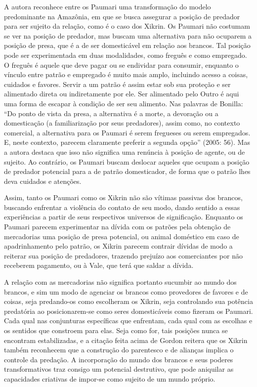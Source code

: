 \documentclass{article}
\begin{document}
A autora reconhece entre os Paumari uma transforma\c{c}\~ao do modelo
predominante na Amaz\^onia, em que se busca assegurar a posi\c{c}\~ao
de predador para ser sujeito da rela\c{c}\~ao, como \'e o caso dos
Xikrin. Os Paumari n\~ao costumam se ver na posi\c{c}\~ao de predador,
mas buscam uma alternativa para n\~ao ocuparem a posi\c{c}\~ao de
presa, que \'e a de ser domestic\'avel em rela\c{c}\~ao aos brancos.
Tal posi\c{c}\~ao pode ser experimentada em duas modalidades, como
fregu\^es e como empregado. O fregu\^es \'e aquele que deve pagar ou se
endividar para consumir, enquanto o v\'inculo entre patr\~ao e
empregado \'e muito mais amplo, incluindo acesso a coisas, cuidados e
favores. Servir a um patr\~ao \'e assim estar sob sua prote\c{c}\~ao e
ser alimentado direta ou indiretamente por ele. Ser alimentado pelo
Outro \'e aqui uma forma de escapar \`a condi\c{c}\~ao de ser seu
alimento. Nas palavras de Bonilla: {\textquotedblleft}Do ponto de vista
da presa, a alternativa \'e a morte, a devora\c{c}\~ao ou a
domestica\c{c}\~ao (a familiariza\c{c}\~ao por seus predadores), assim
como, no contexto comercial, a alternativa para os Paumari \'e serem
fregueses ou serem empregados. E, neste contexto, parecem claramente
preferir a segunda op\c{c}\~ao{\textquotedblright} (2005: 56). Mas a
autora destaca que isso n\~ao significa uma ren\'uncia \`a
posi\c{c}\~ao de agente, ou de sujeito. Ao contr\'ario, os Paumari
buscam deslocar aqueles que ocupam a posi\c{c}\~ao de predador
potencial para a de patr\~ao domesticador, de forma que o patr\~ao lhes
deva cuidados e aten\c{c}\~oes. 

Assim, tanto os Paumari como os Xikrin n\~ao s\~ao v\'itimas passivas
dos brancos, buscando enfrentar a viol\^encia do contato de seu modo,
dando sentido a essas experi\^encias a partir de seus respectivos
universos de significa\c{c}\~ao. Enquanto os Paumari parecem
experimentar na d\'ivida com os patr\~oes pela obten\c{c}\~ao de
mercadorias uma posi\c{c}\~ao de presa potencial, ou animal dom\'estico
em caso de apadrinhamento pelo patr\~ao, os Xikrin parecem contrair
d\'ividas de modo a reiterar sua posi\c{c}\~ao de predadores, trazendo
preju\'izo aos comerciantes por n\~ao receberem pagamento, ou \`a Vale,
que ter\'a que saldar a d\'ivida.

A rela\c{c}\~ao com as mercadorias n\~ao significa portanto sucumbir ao
mundo dos brancos, e sim um modo de agenciar os brancos como provedores
de favores e de coisas, seja predando-os como escolheram os Xikrin,
seja controlando sua pot\^encia predat\'oria ao posicionarem-se como
seres domestic\'aveis como fizeram os Paumari. Cada qual nas
conjunturas espec\'ificas que enfrentam, cada qual com as escolhas e os
sentidos que constroem para elas. Seja como for, tais posi\c{c}\~oes
nunca se encontram estabilizadas, e a cita\c{c}\~ao feita acima de
Gordon reitera que os Xikrin tamb\'em reconhecem que a constru\c{c}\~ao
do parentesco e de alian\c{c}as implica o controle da preda\c{c}\~ao. A
incorpora\c{c}\~ao do mundo dos brancos e seus poderes transformativos
traz consigo um potencial destrutivo, que pode aniquilar as capacidades
criativas de impor-se como sujeito de um mundo pr\'oprio.
\end{document}
